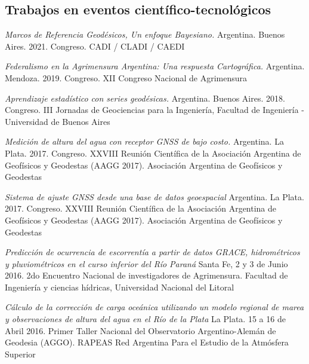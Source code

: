 \documentclass[11pt,a4paper,sans]{moderncv}        %
\begin{document}
\subsection{Trabajos en eventos científico-tecnológicos}

 {\textit{Marcos de Referencia Geodésicos, Un enfoque Bayesiano.} Argentina. Buenos Aires. 2021. Congreso. CADI / CLADI / CAEDI }

 {\textit{Federalismo en la Agrimensura Argentina: Una respuesta Cartográfica.} Argentina. Mendoza. 2019. Congreso. XII Congreso Nacional de Agrimensura}

 {\textit{Aprendizaje estadístico con series geodésicas.} Argentina. Buenos Aires. 2018. Congreso. III Jornadas de Geociencias para la Ingeniería, Facultad de Ingeniería - Universidad de Buenos Aires}

 {\textit{Medición de altura del agua con receptor GNSS de bajo costo.} Argentina. La Plata. 2017. Congreso. XXVIII Reunión Científica de la Asociación Argentina de Geofísicos y Geodestas (AAGG 2017). Asociación Argentina de Geofísicos y Geodestas}

 {\textit{Sistema de ajuste GNSS desde una base de datos geoespacial} Argentina. La Plata. 2017. Congreso. XXVIII Reunión Científica de la Asociación Argentina de Geofísicos y Geodestas (AAGG 2017). Asociación Argentina de Geofísicos y Geodestas}

 {\textit{Predicción de ocurrencia de escorrentía a partir de datos GRACE, hidrométricos y pluviométricos en el curso inferior del Río Paraná} Santa Fe, 2 y 3 de Junio 2016. 2do Encuentro Nacional de investigadores de Agrimensura. Facultad de Ingeniería y ciencias hídricas, Universidad Nacional del Litoral }

 {\textit{Cálculo de la corrección de carga oceánica utilizando un modelo regional de marea y observaciones de altura del agua en el Río de la Plata} La Plata. 15 a 16 de Abril 2016.  Primer Taller Nacional del Observatorio Argentino-Alemán de Geodesia (AGGO). RAPEAS Red Argentina Para el Estudio de la Atmósfera Superior}
\end{document}
